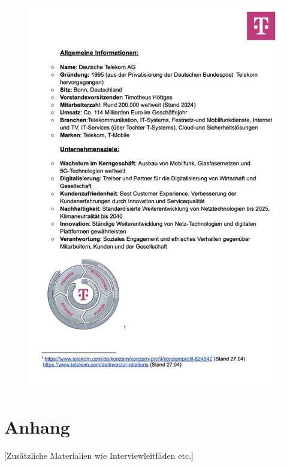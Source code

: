 \documentclass[12pt,a4paper]{article}
\begin{document}
	
	\newpage
	\thispagestyle{empty} %
	\begin{figure}[H]
		\centering
		\includegraphics{images/Bild1.jpg}
	\end{figure}
	\newpage
	\newpage
	\section{Anhang}
	[Zusätzliche Materialien wie Interviewleitfäden etc.]
	
	\newpage
\end{document}
